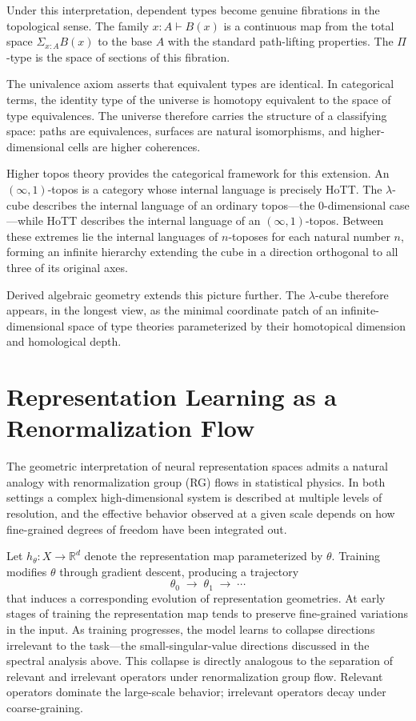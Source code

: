 \documentclass[12pt,a4paper]{article}
\theoremstyle{plain}
\theoremstyle{definition}
\begin{document}
Under this interpretation, dependent types become genuine fibrations in the
topological sense. The family $x : A \vdash B(x)$ is a continuous map from the
total space $\Sigma_{x:A} B(x)$ to the base $A$ with the standard path-lifting
properties. The $\Pi$-type is the space of sections of this fibration.

The univalence axiom asserts that equivalent types are identical. In categorical
terms, the identity type of the universe is homotopy equivalent to the space of
type equivalences. The universe therefore carries the structure of a classifying
space: paths are equivalences, surfaces are natural isomorphisms, and
higher-dimensional cells are higher coherences.

Higher topos theory provides the categorical framework for this extension. An
$(\infty, 1)$-topos is a category whose internal language is precisely HoTT.
The $\lambda$-cube describes the internal language of an ordinary topos---the
$0$-dimensional case---while HoTT describes the internal language of an
$(\infty, 1)$-topos. Between these extremes lie the internal languages of
$n$-toposes for each natural number $n$, forming an infinite hierarchy extending
the cube in a direction orthogonal to all three of its original axes.

Derived algebraic geometry extends this picture further. The $\lambda$-cube
therefore appears, in the longest view, as the minimal coordinate patch of an
infinite-dimensional space of type theories parameterized by their homotopical
dimension and homological depth.

\section{Representation Learning as a Renormalization Flow}
\label{sec:renorm}

The geometric interpretation of neural representation spaces admits a natural
analogy with renormalization group (RG) flows in statistical physics. In both
settings a complex high-dimensional system is described at multiple levels of
resolution, and the effective behavior observed at a given scale depends on how
fine-grained degrees of freedom have been integrated out.

Let $h_\theta : X \to \mathbb{R}^d$ denote the representation map parameterized
by $\theta$. Training modifies $\theta$ through gradient descent, producing a
trajectory
\[
\theta_0 \;\longrightarrow\; \theta_1 \;\longrightarrow\; \cdots
\]
that induces a corresponding evolution of representation geometries. At early
stages of training the representation map tends to preserve fine-grained
variations in the input. As training progresses, the model learns to collapse
directions irrelevant to the task---the small-singular-value directions discussed
in the spectral analysis above. This collapse is directly analogous to the
separation of relevant and irrelevant operators under renormalization group flow.
Relevant operators dominate the large-scale behavior; irrelevant operators decay
under coarse-graining.
\end{document}
